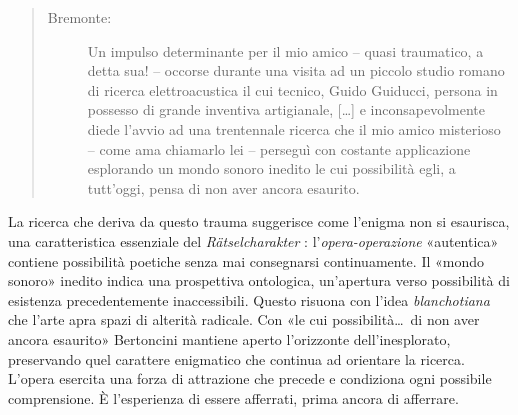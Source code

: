 \begin{quote}
  \begin{sf}
    \small
    \begin{description}
      \item[Bremonte:] %
      Un impulso determinante per il mio amico – quasi traumatico, a detta sua! –
      occorse durante una visita ad un piccolo studio romano di ricerca
      elettroacustica il cui tecnico, Guido Guiducci, persona in possesso di
      grande inventiva artigianale,%
      [\ldots] e inconsapevolmente diede l’avvio ad una trentennale ricerca che il mio
      amico misterioso – come ama chiamarlo lei – perseguì con costante
      applicazione esplorando un mondo sonoro inedito le cui possibilità egli, a
      tutt’oggi, pensa di non aver ancora esaurito.
    \end{description}
  \end{sf}
\end{quote}

La ricerca che deriva da questo trauma suggerisce come l'enigma non si esaurisca,
una caratteristica essenziale del \emph{Rätselcharakter} \cite{adorno1970}: l'\emph{opera-operazione}
«autentica» contiene possibilità poetiche senza mai consegnarsi continuamente.
Il «mondo sonoro»  inedito indica una prospettiva ontologica, un'apertura verso
possibilità di esistenza precedentemente inaccessibili. Questo risuona con
l'idea \emph{blanchotiana} che l'arte apra spazi di alterità radicale.
Con «le cui possibilità\ldots~di non aver ancora esaurito» Bertoncini mantiene
aperto l'orizzonte dell'inesplorato, preservando quel carattere enigmatico che
continua ad orientare la ricerca.
L'opera esercita una forza di attrazione che precede e condiziona ogni possibile
comprensione. È l'esperienza di essere afferrati, prima ancora di afferrare.

